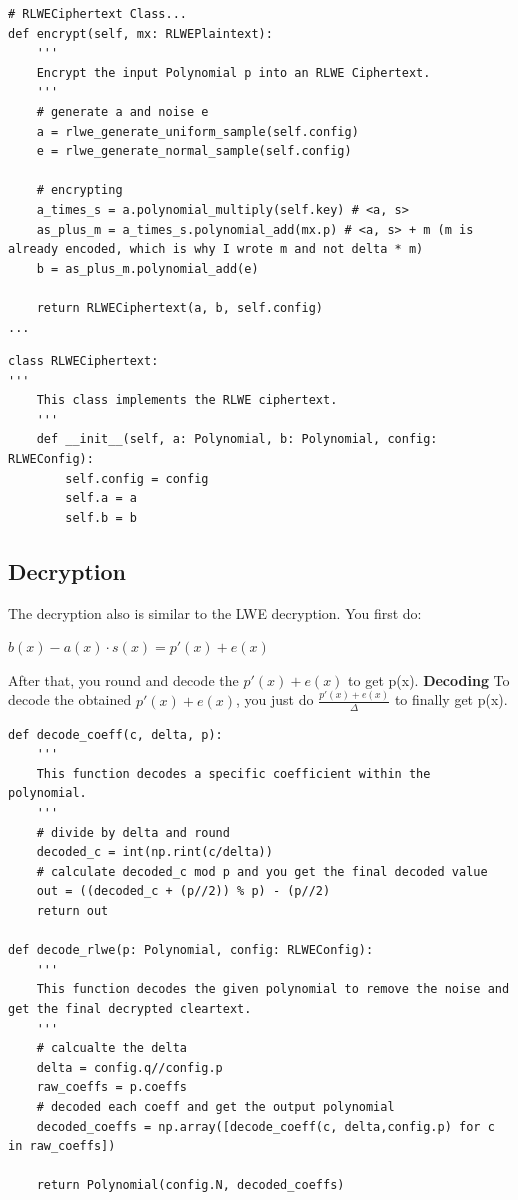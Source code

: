 \documentclass{report}
\begin{document}
\begin{verbatim}
# RLWECiphertext Class...
def encrypt(self, mx: RLWEPlaintext):
	'''
	Encrypt the input Polynomial p into an RLWE Ciphertext.
	'''
	# generate a and noise e
	a = rlwe_generate_uniform_sample(self.config)
	e = rlwe_generate_normal_sample(self.config)
	
	# encrypting
	a_times_s = a.polynomial_multiply(self.key) # <a, s>
	as_plus_m = a_times_s.polynomial_add(mx.p) # <a, s> + m (m is already encoded, which is why I wrote m and not delta * m)
	b = as_plus_m.polynomial_add(e)
	
	return RLWECiphertext(a, b, self.config)
...
\end{verbatim}

\begin{verbatim}
class RLWECiphertext:
'''
	This class implements the RLWE ciphertext.
	'''
	def __init__(self, a: Polynomial, b: Polynomial, config: RLWEConfig):
		self.config = config
		self.a = a
		self.b = b
\end{verbatim}
			
		\subsection{Decryption}
			The decryption also is similar to the LWE decryption. You first do:
			\begin{center}
				$b(x) - a(x) \cdot s(x) =  p'(x) + e(x)$
			\end{center}
			After that, you round and decode the $p'(x) + e(x)$ to get p(x).\newline
			\textbf{Decoding}\newline
				To decode the obtained $p'(x) + e(x)$, you just do $\frac{p'(x) + e(x)}{\Delta}$ to finally get p(x).
\begin{verbatim}
def decode_coeff(c, delta, p):
	'''
	This function decodes a specific coefficient within the polynomial.
	'''
	# divide by delta and round
	decoded_c = int(np.rint(c/delta))
	# calculate decoded_c mod p and you get the final decoded value
	out = ((decoded_c + (p//2)) % p) - (p//2)
	return out
	
def decode_rlwe(p: Polynomial, config: RLWEConfig):
	'''
	This function decodes the given polynomial to remove the noise and get the final decrypted cleartext.
	'''
	# calcualte the delta
	delta = config.q//config.p
	raw_coeffs = p.coeffs
	# decoded each coeff and get the output polynomial
	decoded_coeffs = np.array([decode_coeff(c, delta,config.p) for c in raw_coeffs])
	
	return Polynomial(config.N, decoded_coeffs)
\end{verbatim}
\end{document}
